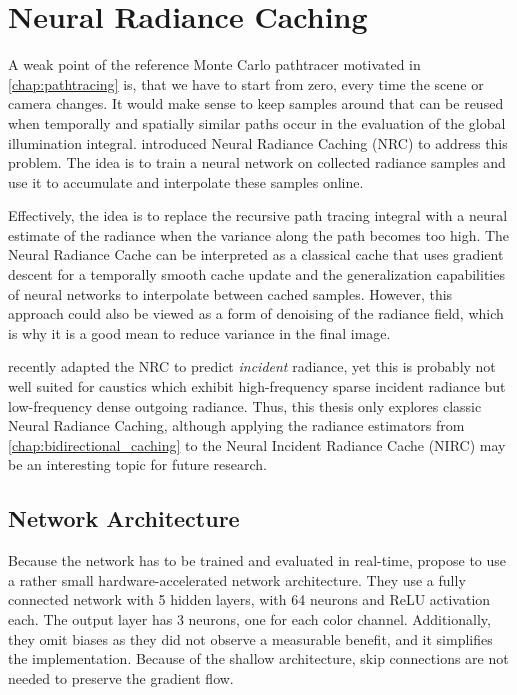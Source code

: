 
\chapter{Neural Radiance Caching}
\label{chap:nrc}
A weak point of the reference Monte Carlo pathtracer motivated in \autoref{chap:pathtracing} is, that we have to start from zero, every time the scene or camera changes.
It would make sense to keep samples around that can be reused when temporally and spatially similar paths occur in the evaluation of the global illumination integral.
\textcite{muller2021} introduced Neural Radiance Caching (NRC) to address this problem.
The idea is to train a neural network on collected radiance samples and use it to accumulate and interpolate these samples online.

Effectively, the idea is to replace the recursive path tracing integral with a neural estimate of the radiance when the variance along the path becomes too high.
The Neural Radiance Cache can be interpreted as a classical cache that uses gradient descent for a temporally smooth cache update and the generalization capabilities of neural networks to interpolate between cached samples.
However, this approach could also be viewed as a form of denoising of the radiance field, which is why it is a good mean to reduce variance in the final image.

\textcite{dereviannykh2024} recently adapted the NRC to predict \emph{incident} radiance, yet this is probably not well suited for caustics which exhibit high-frequency sparse incident radiance but low-frequency dense outgoing radiance.
Thus, this thesis only explores classic Neural Radiance Caching, although applying the radiance estimators from \autoref{chap:bidirectional_caching} to the Neural Incident Radiance Cache (NIRC) may be an interesting topic for future research.

\section{Network Architecture}
Because the network has to be trained and evaluated in real-time, \textcite{muller2021} propose to use a rather small hardware-accelerated network architecture.
They use a fully connected network with 5 hidden layers, with 64 neurons and ReLU activation each.
The output layer has 3 neurons, one for each color channel.
Additionally, they omit biases as they did not observe a measurable benefit, and it simplifies the implementation.
Because of the shallow architecture, skip connections are not needed to preserve the gradient flow.

